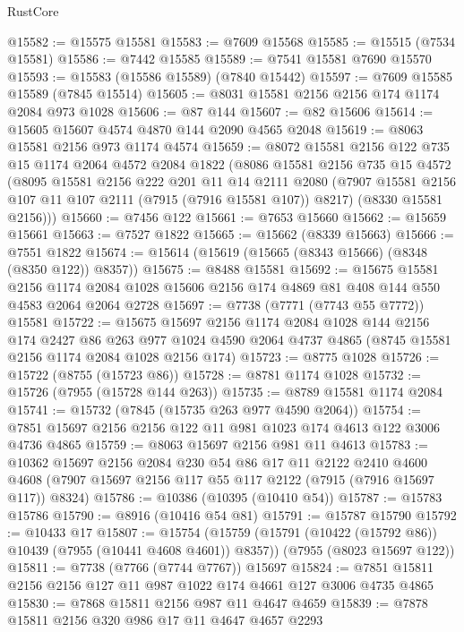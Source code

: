 \begin{lexlean}{RustCore}
\begin{coremodule}
@15582 := @15575 @15581
@15583 := @7609 @15568
@15585 := @15515 (@7534 @15581)
@15586 := @7442 @15585
@15589 := @7541 @15581 @7690 @15570
@15593 := @15583 (@15586 @15589) (@7840 @15442)
@15597 := @7609 @15585 @15589 (@7845 @15514)
@15605 := @8031 @15581 @2156 @2156 @174 @1174 @2084 @973 @1028
@15606 := @87 @144
@15607 := @82 @15606
@15614 := @15605 @15607 @4574 @4870 @144 @2090 @4565 @2048
@15619 := @8063 @15581 @2156 @973 @1174 @4574
@15659 := @8072
    @15581
    @2156
    @122
    @735
    @15
    @1174
    @2064
    @4572
    @2084
    @1822
    (@8086
      @15581
      @2156
      @735
      @15
      @4572
      (@8095
        @15581
        @2156
        @222
        @201
        @11
        @14
        @2111
        @2080
        (@7907 @15581 @2156 @107 @11 @107 @2111 (@7915 (@7916 @15581 @107)) @8217)
        (@8330 @15581 @2156)))
@15660 := @7456 @122
@15661 := @7653 @15660
@15662 := @15659 @15661
@15663 := @7527 @1822
@15665 := @15662 (@8339 @15663)
@15666 := @7551 @1822
@15674 := @15614 (@15619 (@15665 (@8343 @15666) (@8348 (@8350 @122)) @8357))
@15675 := @8488 @15581
@15692 := @15675
    @15581
    @2156
    @1174
    @2084
    @1028
    @15606
    @2156
    @174
    @4869
    @81
    @408
    @144
    @550
    @4583
    @2064
    @2064
    @2728
@15697 := @7738 (@7771 (@7743 @55 @7772)) @15581
@15722 := @15675
    @15697
    @2156
    @1174
    @2084
    @1028
    @144
    @2156
    @174
    @2427
    @86
    @263
    @977
    @1024
    @4590
    @2064
    @4737
    @4865
    (@8745 @15581 @2156 @1174 @2084 @1028 @2156 @174)
@15723 := @8775 @1028
@15726 := @15722 (@8755 (@15723 @86))
@15728 := @8781 @1174 @1028
@15732 := @15726 (@7955 (@15728 @144 @263))
@15735 := @8789 @15581 @1174 @2084
@15741 := @15732 (@7845 (@15735 @263 @977 @4590 @2064))
@15754 := @7851 @15697 @2156 @2156 @122 @11 @981 @1023 @174 @4613 @122 @3006 @4736 @4865
@15759 := @8063 @15697 @2156 @981 @11 @4613
@15783 := @10362
    @15697
    @2156
    @2084
    @230
    @54
    @86
    @17
    @11
    @2122
    @2410
    @4600
    @4608
    (@7907 @15697 @2156 @117 @55 @117 @2122 (@7915 (@7916 @15697 @117)) @8324)
@15786 := @10386 (@10395 (@10410 @54))
@15787 := @15783 @15786
@15790 := @8916 (@10416 @54 @81)
@15791 := @15787 @15790
@15792 := @10433 @17
@15807 := @15754
    (@15759 (@15791 (@10422 (@15792 @86)) @10439 (@7955 (@10441 @4608 @4601)) @8357))
    (@7955 (@8023 @15697 @122))
@15811 := @7738 (@7766 (@7744 @7767)) @15697
@15824 := @7851 @15811 @2156 @2156 @127 @11 @987 @1022 @174 @4661 @127 @3006 @4735 @4865
@15830 := @7868 @15811 @2156 @987 @11 @4647 @4659
@15839 := @7878 @15811 @2156 @320 @986 @17 @11 @4647 @4657 @2293

\end{coremodule}
\end{lexlean}
